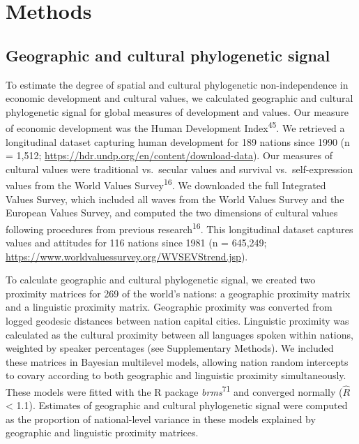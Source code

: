 \documentclass[
  man,floatsintext]{apa6}
\begin{document}
\hypertarget{methods}{%
\section{Methods}\label{methods}}

\hypertarget{geographic-and-cultural-phylogenetic-signal}{%
\subsection{Geographic and cultural phylogenetic signal}\label{geographic-and-cultural-phylogenetic-signal}}

To estimate the degree of spatial and cultural phylogenetic non-independence in economic development and cultural values, we calculated geographic and cultural phylogenetic signal for global measures of development and values. Our measure of economic development was the Human Development Index\textsuperscript{45}. We retrieved a longitudinal dataset capturing human development for 189 nations since 1990 (n = 1,512; \url{https://hdr.undp.org/en/content/download-data}). Our measures of cultural values were traditional vs.~secular values and survival vs.~self-expression values from the World Values Survey\textsuperscript{16}. We downloaded the full Integrated Values Survey, which included all waves from the World Values Survey and the European Values Survey, and computed the two dimensions of cultural values following procedures from previous research\textsuperscript{16}. This longitudinal dataset captures values and attitudes for 116 nations since 1981 (n = 645,249; \url{https://www.worldvaluessurvey.org/WVSEVStrend.jsp}).

To calculate geographic and cultural phylogenetic signal, we created two proximity matrices for 269 of the world's nations: a geographic proximity matrix and a linguistic proximity matrix. Geographic proximity was converted from logged geodesic distances between nation capital cities. Linguistic proximity was calculated as the cultural proximity between all languages spoken within nations, weighted by speaker percentages (see Supplementary Methods). We included these matrices in Bayesian multilevel models, allowing nation random intercepts to covary according to both geographic and linguistic proximity simultaneously. These models were fitted with the R package \emph{brms}\textsuperscript{71} and converged normally (\(\hat{R}\) \textless{} 1.1). Estimates of geographic and cultural phylogenetic signal were computed as the proportion of national-level variance in these models explained by geographic and linguistic proximity matrices.
\end{document}
